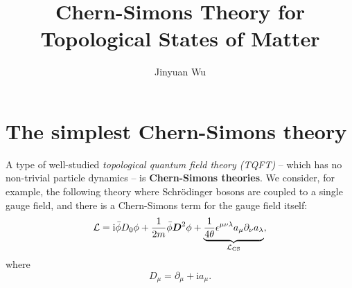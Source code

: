 \documentclass[hyperref, a4paper]{article}
\title{Chern-Simons Theory for Topological States of Matter}
\author{Jinyuan Wu}
\newcommand*{\ii}{\mathrm{i}}
\newcommand*{\concept}[1]{{\textbf{#1}}}
\begin{document}
\maketitle

\section{The simplest Chern-Simons theory}\label{sec:simple-cs}

A type of well-studied \emph{topological quantum field theory (TQFT)} -- which has no non-trivial particle dynamics -- is \concept{Chern-Simons theories}.
We consider, for example, the following theory where Schrödinger bosons are coupled to a single gauge field,
and there is a Chern-Simons term for the gauge field itself:
\begin{equation}
    \mathcal{L}= \ii \bar{\phi} D_{0} \phi+\frac{1}{2 m} \bar{\phi} \vb*{D}^{2} \phi
    +\underbrace{\frac{1}{4 \theta} \epsilon^{\mu \nu \lambda} a_{\mu} \partial_{\nu} a_{\lambda}}_{\mathcal{L}_\text{CS}},
    \label{eq:simplest-cs-theory}
\end{equation} 
where 
\begin{equation}
    D_{\mu}=\partial_{\mu}+ \ii a_{\mu}.
\end{equation}
\end{document}
